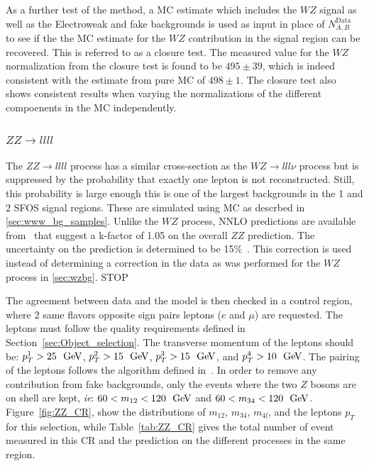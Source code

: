 As a further test of the method, a MC estimate which includes the $WZ$ signal as
well as the Electroweak and fake backgrounds is used as input in place 
of $N^{\textrm{Data}}_{A,B}$ to see if the the MC estimate for the $WZ$
contribution in the signal region can be recovered. This is referred to as
a closure test.  The measured value for the $WZ$ normalization from the 
closure test is found to be  $495\pm39$, which is indeed consistent with the
estimate from pure MC of $498\pm1$. The closure test also shows consistent
results when varying the normalizations of the different compoenents 
in the MC independently.




\subsubsection{$ZZ\rightarrow llll$}
\label{sec:zzbg}

The $ZZ\rightarrow llll$ process has a similar cross-section as 
the $WZ\rightarrow lll\nu$ process but is 
suppressed by the probability that exactly one lepton is not reconstructed. 
Still, this probability is large enough this is one of the largest backgrounds
in the 1 and 2 SFOS signal regions. These are simulated
using MC as descrbed in \sec\ref{sec:www_bg_samples}.
Unlike the $WZ$ process, NNLO predictions are available 
from~\cite{Cascioli:2014yka,Baglio:2013toa,Bierweiler:2013dja}
that suggest a k-factor of 1.05 on the overall $ZZ$ prediction.
The uncertainty on the prediction is determined to be 
15\%~\cite{Cascioli:2014yka,Baglio:2013toa,Bierweiler:2013dja}.
This correction is used instead of determining a correction in the data
as was performed for the $WZ$ process in \sec\ref{sec:wzbg}.
STOP


The agreement between data and the model is then checked in a control region, where 2 same flavors opposite sign pairs leptons ($e$ and $\mu$) are requested. The leptons must follow the quality requirements defined in Section~\ref{sec:Object_selection}. The transverse momentum of the leptons should be: $p_{T}^{1}>25~\GeV$, $p_{T}^{2}>15~\GeV$, $p_{T}^{3}>15~\GeV$, and  $p_{T}^{4}>10~\GeV$. The pairing of the leptons follows the algorithm defined in~\cite{Aad:2014wra}. In order to remove any contribution from fake backgrounds, only the events where the two $Z$ bosons are on shell are kept, \textit{ie}: $60<m_{12}<120~\GeV$ and $60<m_{34}<120~\GeV$. Figure~\ref{fig:ZZ_CR}, show the distributions of $m_{12}$, $m_{34}$, $m_{4l}$, and the leptons $p_{T}$ for this selection, while Table~\ref{tab:ZZ_CR} gives the total number of event measured in this CR and the prediction on the different processes in the same region.

